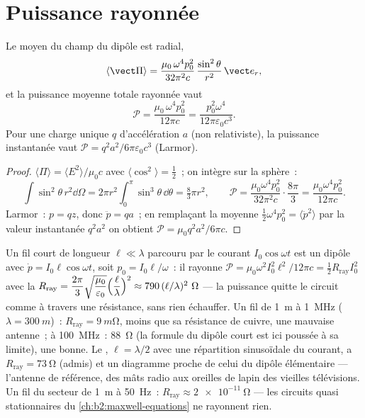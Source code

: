 \section{Puissance rayonnée}

\begin{proposition}\label{prop:b2:dipole-radiation:power}
Le  moyen du champ du dipôle est radial,
\[
\langle\vect\Pi\rangle = \frac{\mu_0\,\omega^4p_0^2}{32\pi^2c}\,\frac{\sin^2\theta}{r^2}\,\vect e_r ,
\]
et la puissance moyenne totale rayonnée vaut
\[
\mathcal P = \frac{\mu_0\,\omega^4p_0^2}{12\pi c} = \frac{p_0^2\omega^4}{12\pi\varepsilon_0c^3} .
\]
Pour une charge unique $q$ d'accélération $a$ (non relativiste), la
puissance instantanée vaut $\mathcal P = q^2a^2/6\pi\varepsilon_0c^3$ (Larmor).
\end{proposition}

\begin{proof}
$\langle\Pi\rangle = \langle E^2\rangle/\mu_0c$ avec $\langle\cos^2\rangle = \tfrac12$~;
on intègre sur la sphère~:
\[
\int\sin^2\theta\,r^2\dd\Omega = 2\pi r^2\int_0^\pi\sin^3\theta\,\dd\theta = \tfrac83\pi r^2 ,
\qquad
\mathcal P = \frac{\mu_0\omega^4p_0^2}{32\pi^2c}\cdot\frac{8\pi}3 = \frac{\mu_0\omega^4p_0^2}{12\pi c} .
\]
Larmor~: $p = qz$, donc $\ddot p = qa$~;
en remplaçant la moyenne $\tfrac12\omega^4p_0^2 = \langle\ddot p^2\rangle$ par la valeur
instantanée $q^2a^2$ on obtient $\mathcal P = \mu_0q^2a^2/6\pi c$.
\end{proof}

\begin{example}\label{ex:b2:dipole-radiation:antenna}
Un fil court de longueur $\ell \ll \lambda$ parcouru par le courant $I_0\cos\omega t$ est un
dipôle avec $\dot p = I_0\ell\cos\omega t$, soit $p_0 = I_0\ell/\omega$~: il rayonne
$\mathcal P = \mu_0\omega^2I_0^2\ell^2/12\pi c = \tfrac12R_{\text{ray}}I_0^2$ avec la
\emph{} $R_{\text{ray}} = \dfrac{2\pi}3\sqrt{\dfrac{\mu_0}{\varepsilon_0}}
\Bigl(\dfrac\ell\lambda\Bigr)^2 \approx 790\,(\ell/\lambda)^2\ \Omega$ --- la puissance quitte le
circuit comme à travers une résistance, sans rien échauffer. Un fil de \qty{1}{m}
à \qty{1}{MHz} ($\lambda = \qty{300}{m}$)~: $R_{\text{ray}} = \qty{9}{m\ohm}$, moins que
sa résistance de cuivre, une mauvaise antenne~; à \qty{100}{MHz}~: \qty{88}{\ohm} (la
formule du dipôle court est ici poussée à sa limite), une bonne. Le \emph{}, $\ell = \lambda/2$ avec une répartition sinusoïdale du courant, a
$R_{\text{ray}} = \qty{73}{\ohm}$ (admis) et un diagramme proche de celui du
dipôle élémentaire --- l'antenne de référence, des mâts radio aux
oreilles de lapin des vieilles télévisions. Un fil du secteur de \qty{1}{m} à \qty{50}{Hz}~:
$R_{\text{ray}} \approx \qty{2e-11}{\ohm}$ --- les circuits quasi stationnaires du
\cref{ch:b2:maxwell-equations} ne rayonnent rien.
\end{example}

